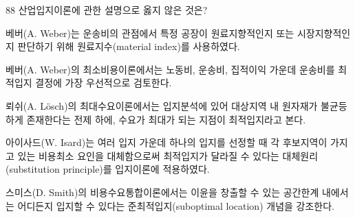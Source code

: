 \begin{question}{88}
산업입지이론에 관한 설명으로 옳지 않은 것은?
\begin{choices}
  \item 베버(A. Weber)는 운송비의 관점에서 특정 공장이 원료지향적인지 또는 시장지향적인지 판단하기 위해 원료지수(material index)를 사용하였다.
  \item 베버(A. Weber)의 최소비용이론에서는 노동비, 운송비, 집적이익 가운데 운송비를 최적입지 결정에 가장 우선적으로 검토한다.
  \item 뢰쉬(A. Lösch)의 최대수요이론에서는 입지분석에 있어 대상지역 내 원자재가 불균등하게 존재한다는 전제 하에, 수요가 최대가 되는 지점이 최적입지라고 본다.
  \item 아이사드(W. Isard)는 여러 입지 가운데 하나의 입지를 선정할 때 각 후보지역이 가지고 있는 비용최소 요인을 대체함으로써 최적입지가 달라질 수 있다는 대체원리(substitution principle)를 입지이론에 적용하였다.
  \item 스미스(D. Smith)의 비용수요통합이론에서는 이윤을 창출할 수 있는 공간한계 내에서는 어디든지 입지할 수 있다는 준최적입지(suboptimal location) 개념을 강조한다.
\end{choices}
\end{question}
